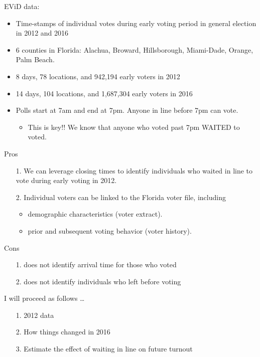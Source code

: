 \documentclass{beamer}
\begin{document}
		\begin{frame}
		EViD data:
			\begin{itemize}
				\item<2->Time-stamps of individual votes during early voting period in general election in 2012 and 2016
				\item<2->6 counties in Florida: Alachua, Broward, Hillsborough,  Miami-Dade, Orange, Palm Beach.
				\item<2->8 days, 78 locations, and 942,194 early voters in 2012 
				\item<2->14 days, 104 locations, and 1,687,304 early voters in 2016 
			\end{itemize}
			\begin{itemize}
				\item<3->[]Polls start at 7am and end at 7pm.  Anyone in line before 7pm can vote.
				\begin{itemize}
					\item This is key!! We know that anyone who voted past 7pm WAITED to voted.
				\end{itemize} 
			\end{itemize} 
		\end{frame}
			
		\begin{frame}
		Pros
			\begin{itemize}
				\item[1.]  We can leverage closing times to identify individuals who waited in line to vote during early voting in 2012. 
				\item[2.]  Individual voters can be linked to the Florida voter file, including
					\begin{itemize}
					\item  demographic characteristics (voter extract). 
					\item  prior and subsequent voting behavior (voter history). 
					\end{itemize}
			\end{itemize}
		Cons
			\begin{itemize}
				\item[1.] does not identify arrival time for those who voted
				\item[2.] does not identify individuals who left before voting
			\end{itemize}
		\end{frame}
		
		\begin{frame}
		I will proceed as follows \ldots
			\begin{itemize}
				\item[1.] 2012 data
				\item[2.] How things changed in 2016 
				\item[3.] Estimate the effect of waiting in line on future turnout
			\end{itemize}
		\end{frame}
		
\end{document}
